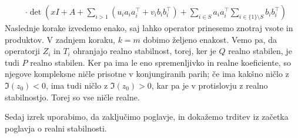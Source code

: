 \begin{dokaz}
\begin{align*}
                                & \cdot \det\left(xI + A + \sum_{i > 1} (u_i a_i a_i^\top + v_i b_i b_i^\top) + \sum_{i\in S}a_ia_i^\top \sum_{i\in \{1\}\setminus S} b_i b_i^\top\right)
    \end{align*}
    Naslednje korake izvedemo enako, saj lahko operator prinesemo znotraj vsote in produktov. V zadnjem koraku, \(k=m\) dobimo željeno enakost. Vemo pa, da operatorji \(Z_i\) in \(T_i\) ohranjajo realno stabilnost, torej, ker je \(Q\) realno stabilen, je tudi \(P\) realno stabilen. Ker pa ima le eno spremenljivko in realne koeficiente, so njegove kompleksne ničle prisotne v konjungiranih parih; če ima kakšno ničlo z \(\Im(z_0)<0\), ima tudi ničlo z \(\Im(z_0)>0\), kar pa je v protislovju z realno stabilnostjo. Torej so vse ničle realne.
\end{dokaz}

Sedaj izrek uporabimo, da zaključimo poglavje, in dokažemo trditev iz začetka poglavja o realni stabilnosti.

